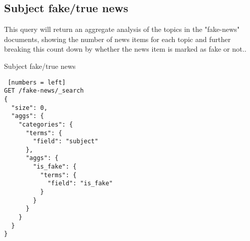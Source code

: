 \subsection{Subject fake/true news}
This query will return an aggregate analysis of the topics in the "fake-news" documents, showing the number of news items for each topic and further breaking this count down by whether the news item is marked as fake or not..\\

\begin{algorithm}[ht]
\caption{Subject fake/true news}
\begin{lstlisting} [numbers = left]
GET /fake-news/_search
{ 
  "size": 0,
  "aggs": {
    "categories": {
      "terms": {
        "field": "subject"
      },
      "aggs": {
        "is_fake": {
          "terms": {
            "field": "is_fake"
          }
        }
      }
    }
  }
}
\end{lstlisting}
\end{algorithm}
\newpage

